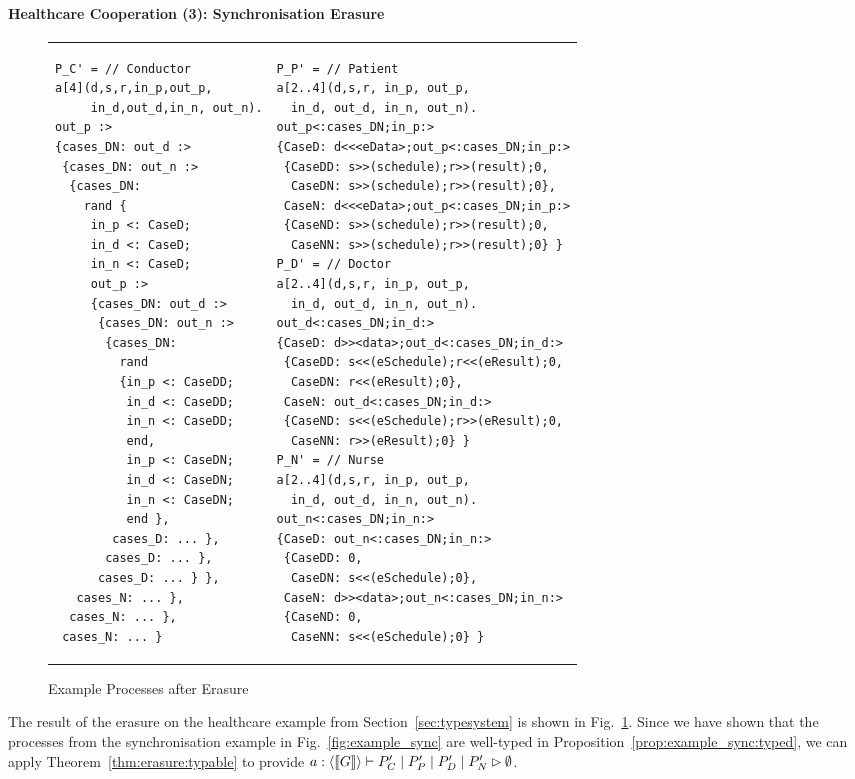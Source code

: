 \paragraph{Healthcare Cooperation (3): Synchronisation Erasure} \begin{figure}[t] \scriptsize
\vspace*{-4mm}
\begin{tabular}{p{9cm}p{7cm}}
\begin{lstlisting}
P_C' = // Conductor
a[4](d,s,r,in_p,out_p,
     in_d,out_d,in_n, out_n).
out_p :>
{cases_DN: out_d :>
 {cases_DN: out_n :>
  {cases_DN:
    rand {
     in_p <: CaseD;
     in_d <: CaseD;
     in_n <: CaseD;
     out_p :>
     {cases_DN: out_d :>
      {cases_DN: out_n :>
       {cases_DN:
         rand
         {in_p <: CaseDD;
          in_d <: CaseDD;
          in_n <: CaseDD;
          end,
          in_p <: CaseDN;
          in_d <: CaseDN;
          in_n <: CaseDN;
          end },
        cases_D: ... },
       cases_D: ... },
      cases_D: ... } },
   cases_N: ... },
  cases_N: ... },
 cases_N: ... }
\end{lstlisting}
&
\begin{lstlisting}
P_P' = // Patient
a[2..4](d,s,r, in_p, out_p,
  in_d, out_d, in_n, out_n).
out_p<:cases_DN;in_p:>
{CaseD: d<<<eData>;out_p<:cases_DN;in_p:>
 {CaseDD: s>>(schedule);r>>(result);0,
  CaseDN: s>>(schedule);r>>(result);0},
 CaseN: d<<<eData>;out_p<:cases_DN;in_p:>
 {CaseND: s>>(schedule);r>>(result);0,
  CaseNN: s>>(schedule);r>>(result);0} }
P_D' = // Doctor
a[2..4](d,s,r, in_p, out_p,
  in_d, out_d, in_n, out_n).
out_d<:cases_DN;in_d:>
{CaseD: d>><data>;out_d<:cases_DN;in_d:>
 {CaseDD: s<<(eSchedule);r<<(eResult);0,
  CaseDN: r<<(eResult);0},
 CaseN: out_d<:cases_DN;in_d:>
 {CaseND: s<<(eSchedule);r>>(eResult);0,
  CaseNN: r>>(eResult);0} }
P_N' = // Nurse
a[2..4](d,s,r, in_p, out_p,
  in_d, out_d, in_n, out_n).
out_n<:cases_DN;in_n:>
{CaseD: out_n<:cases_DN;in_n:>
 {CaseDD: 0,
  CaseDN: s<<(eSchedule);0},
 CaseN: d>><data>;out_n<:cases_DN;in_n:>
 {CaseND: 0,
  CaseNN: s<<(eSchedule);0} }
\end{lstlisting}
\end{tabular}
\vspace*{-5mm}
\caption{Example Processes after Erasure}
\label{fig:example_erasure}
\end{figure} The result of the erasure on the healthcare example from
Section~\ref{sec:typesystem} is shown in Fig.~\ref{fig:example_erasure}.
Since we have shown that the processes from the synchronisation example in
Fig.~\ref{fig:example_sync} are well-typed in
Proposition~\ref{prop:example_sync:typed}, we can apply
Theorem~\ref{thm:erasure:typable} to 
provide $\nobreak{a:\langle \ensuremath{\left\llbracket G \right\rrbracket} \rangle \vdash P'_C \mid P'_P
\mid P'_D \mid P'_N \rhd \emptyset}$. 


